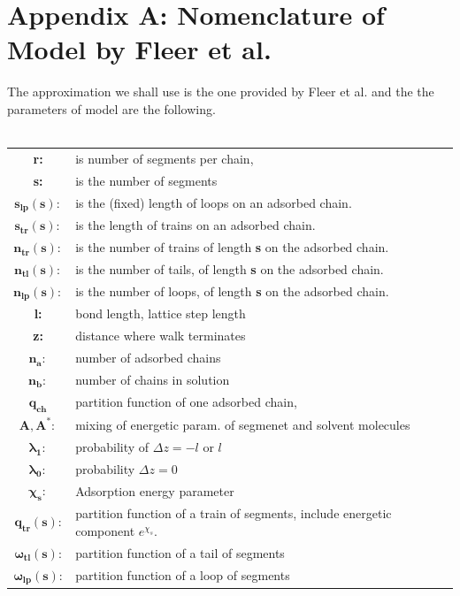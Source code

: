 \documentclass[10pt,letterpaper]{article}
\begin{document}
 






\newpage
\section*{Appendix A: Nomenclature of Model by Fleer et al.}
The approximation we shall use is the one provided by Fleer et al.\cite{fleer1993polymers} and the the parameters of model are the following.\\\\
%
\begin{tabular}{c|l}
\hline
\textbf{r:} & is number of segments per chain,\\
\textbf{s:} & is the number of segments \\ 
$\mathbf{s_{lp}(s):}$ &is the (fixed) length of loops on an adsorbed chain.\\
$\mathbf{s_{tr}(s):}$ &is the length of trains on an adsorbed chain.\\
$\mathbf{n_{tr}(s):}$ & is the number of trains of length \textbf{s}  on the adsorbed chain.\\
$\mathbf{n_{tl}(s):}$ &is the number of tails, of length \textbf{s}  on the adsorbed chain.\\
$\mathbf{n_{lp}(s):}$ &is the number of loops, of length \textbf{s}  on the adsorbed chain.\\
\textbf{l:}&bond length, lattice step length\\
\textbf{z:}&distance where walk terminates\\
$\mathbf{n_a:}$ &number of adsorbed chains\\
$\mathbf{n_b:}$&number of chains in solution\\
$\mathbf{q_{ch}}$&partition function of one adsorbed chain,\\
$\mathbf{A,A^{*}:}$& mixing of energetic param. of segmenet and solvent molecules\footnotemark \\
$\mathbf{\lambda_1:}$&probability of $\Delta z=-l$ or $l$\\
$\mathbf{\lambda_0:}$ &probability $\Delta z=0$\\
$\mathbf{\chi_{s}:}$ &Adsorption energy parameter\\
$\mathbf{q_{tr}(s)}$: & partition function of a train of segments, include energetic component $e^{\chi_s}$.\\
$\mathbf{\omega_{tl}(s)}$:&partition function of a tail of segments\\
$\mathbf{\omega_{lp}(s)}$:&partition function of a loop of segments\\

\end{tabular}
\end{document}
